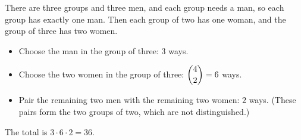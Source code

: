 There are three groups and three men, and each group needs a man, so each group has exactly one man. Then each group of two has one woman, and the group of three has two women.
\begin{itemize}
\item Choose the man in the group of three: $3$ ways.
\item Choose the two women in the group of three: $\dbinom42=6$ ways.
\item Pair the remaining two men with the remaining two women: $2$ ways. (These pairs form the two groups of two, which are not distinguished.)
\end{itemize}
The total is $3\cdot6\cdot2=\boxed{36}$.
